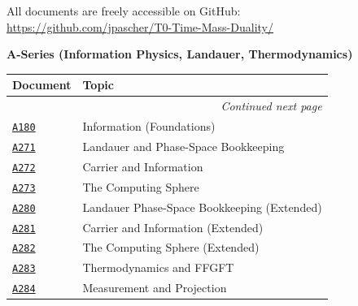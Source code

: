 
All documents are freely accessible on GitHub:\\
\url{https://github.com/jpascher/T0-Time-Mass-Duality/}

\vspace{0.5em}

\noindent\textbf{A-Series (Information Physics, Landauer, Thermodynamics)}

\vspace{0.3em}
{\scriptsize
\setlength{\LTleft}{0pt}
\setlength{\LTright}{0pt}
\begin{longtable}{@{}p{}p{}@{}}
\toprule
\textbf{Document} & \textbf{Topic} \\
\midrule
\endhead
\midrule
\multicolumn{2}{r}{\scriptsize\itshape Continued next page} \\
\endfoot
\bottomrule
\endlastfoot
\href{https://github.com/jpascher/T0-Time-Mass-Duality/blob/main/A_Serie_Export/pdf/A180_Information_De.pdf}{\texttt{A180}} &
  Information (Foundations) \\
\href{https://github.com/jpascher/T0-Time-Mass-Duality/blob/main/A_Serie_Export/pdf/A271_Landauer_De.pdf}{\texttt{A271}} &
  Landauer and Phase-Space Bookkeeping \\
\href{https://github.com/jpascher/T0-Time-Mass-Duality/blob/main/A_Serie_Export/pdf/A272_Traeger_und_Information_De.pdf}{\texttt{A272}} &
  Carrier and Information \\
\href{https://github.com/jpascher/T0-Time-Mass-Duality/blob/main/A_Serie_Export/pdf/A273_Die_Rechenkugel_De.pdf}{\texttt{A273}} &
  The Computing Sphere \\
\href{https://github.com/jpascher/T0-Time-Mass-Duality/blob/main/A_Serie_Export/pdf/A280_Landauer_Phasenraum_Buchhaltung_De.pdf}{\texttt{A280}} &
  Landauer Phase-Space Bookkeeping (Extended) \\
\href{https://github.com/jpascher/T0-Time-Mass-Duality/blob/main/A_Serie_Export/pdf/A281_Traeger_und_Information_De.pdf}{\texttt{A281}} &
  Carrier and Information (Extended) \\
\href{https://github.com/jpascher/T0-Time-Mass-Duality/blob/main/A_Serie_Export/pdf/A282_Die_Rechenkugel_De.pdf}{\texttt{A282}} &
  The Computing Sphere (Extended) \\
\href{https://github.com/jpascher/T0-Time-Mass-Duality/blob/main/A_Serie_Export/pdf/A283_Thermodynamik_FFGFT_De.pdf}{\texttt{A283}} &
  Thermodynamics and FFGFT \\
\href{https://github.com/jpascher/T0-Time-Mass-Duality/blob/main/A_Serie_Export/pdf/A284_Messung_Projektion_De.pdf}{\texttt{A284}} &
  Measurement and Projection \\
\end{longtable}
}

